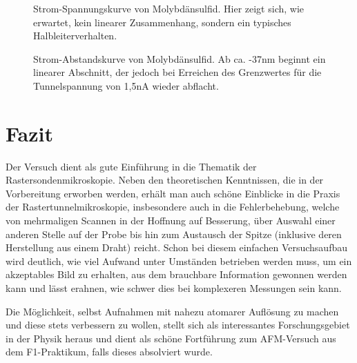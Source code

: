 \begin{figure}[H]
	\centering
	\caption{Strom-Spannungskurve von Molybdänsulfid. Hier zeigt sich, wie erwartet, kein linearer Zusammenhang, sondern ein typisches Halbleiterverhalten.}
	\label{uimos}
\end{figure}




\begin{figure}[H]
	\centering
	\caption{Strom-Abstandskurve von Molybdänsulfid. Ab ca. -37nm beginnt ein linearer Abschnitt, der jedoch bei Erreichen des Grenzwertes für die Tunnelspannung von 1,5nA wieder abflacht.}
	\label{uamos}
\end{figure}

\chapter{Fazit}
Der Versuch dient als gute Einführung in die Thematik der Rastersondenmikroskopie. Neben den theoretischen Kenntnissen, die in der Vorbereitung erworben werden, erhält man auch schöne Einblicke in die Praxis der Rastertunnelmikroskopie, insbesondere auch in die Fehlerbehebung, welche von mehrmaligen Scannen in der Hoffnung auf Besserung, über Auswahl einer anderen Stelle auf der Probe bis hin zum Austausch der Spitze (inklusive deren Herstellung aus einem Draht) reicht. Schon bei diesem einfachen Versuchsaufbau wird deutlich, wie viel Aufwand unter Umständen betrieben werden muss, um ein akzeptables Bild zu erhalten, aus dem brauchbare Information gewonnen werden kann und lässt erahnen, wie schwer dies bei komplexeren Messungen sein kann.

Die Möglichkeit, selbst Aufnahmen mit nahezu atomarer Auflösung zu machen und diese stets verbessern zu wollen, stellt sich als interessantes Forschungsgebiet in der Physik heraus und dient als schöne Fortführung zum AFM-Versuch aus dem F1-Praktikum, falls dieses absolviert wurde.

